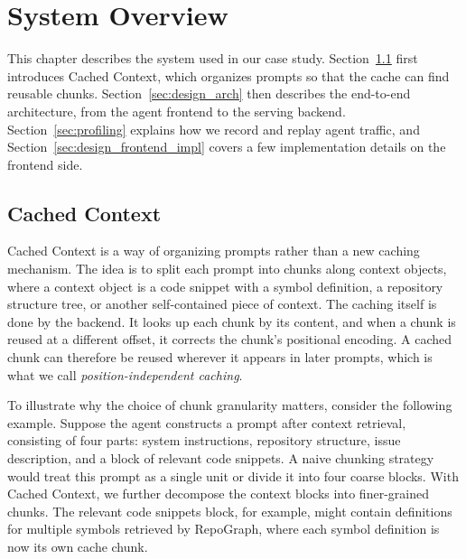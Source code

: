 \chapter{System Overview}
\label{cha:design}

This chapter describes the system used in our case study. Section~\ref{sec:design_cc} first introduces Cached Context, which organizes prompts so that the cache can find reusable chunks. Section~\ref{sec:design_arch} then describes the end-to-end architecture, from the agent frontend to the serving backend. Section~\ref{sec:profiling} explains how we record and replay agent traffic, and Section~\ref{sec:design_frontend_impl} covers a few implementation details on the frontend side.

\section{Cached Context}
\label{sec:design_cc}
Cached Context  is a way of organizing prompts
rather than a new caching mechanism. The idea is to split each prompt into chunks along context objects, where a context object is a code snippet with a symbol definition, a repository structure tree, or another self-contained piece of context. The caching itself is done by the backend. It looks up each chunk by its content, and when a chunk is reused at a different offset, it corrects the chunk's positional encoding. A cached chunk can therefore be reused wherever it appears in later prompts, which is what we call \emph{position-independent caching}.

To illustrate why the choice of chunk granularity matters, consider the following example. Suppose the agent constructs a prompt after context retrieval, consisting of four parts: system instructions, repository structure, issue description, and a block of relevant code snippets. A naive chunking strategy would treat this prompt as a single unit or divide it into four coarse blocks. With Cached Context, we further decompose the context blocks into finer-grained chunks. The relevant code snippets block, for example, might contain definitions for multiple symbols retrieved by RepoGraph, where each symbol definition is now its own cache chunk.

